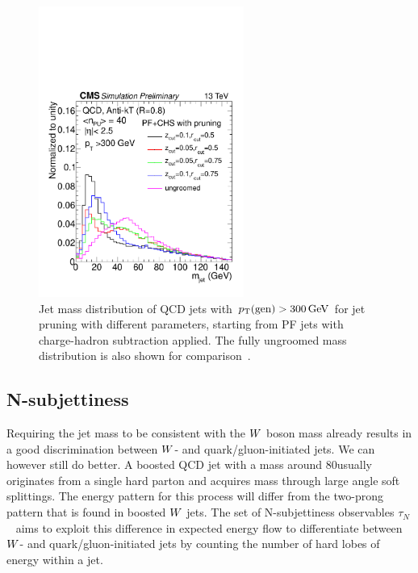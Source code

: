 \begin{figure}
  \centering
  \includegraphics[width=0.6\textwidth]{figures/razor_wtag/1DPFCHS_PR_QCD}
  \caption{Jet mass distribution of QCD jets with $p_{\mathrm{T}}(\textrm{gen}) > 300 \,\text{Ge\hspace{-.08em}V}$ for jet pruning
with different parameters, starting from PF jets with charge-hadron subtraction applied. The fully
ungroomed mass distribution is also shown for comparison~\cite{CMS-PAS-JME-14-001}. 
  \label{fig:wtag_jet_pruning}}
\end{figure}


\subsection{N-subjettiness}

Requiring the jet mass to be consistent with the $W$ boson mass already results in a good
discrimination between $W$- and quark/gluon-initiated jets. We can however still do better. A
boosted QCD jet with a mass around 80\GeV usually originates from a single hard parton and acquires
mass through large angle soft splittings. The energy pattern for this process will differ from the
two-prong pattern that is found in boosted $W$ jets.  
The set of N-subjettiness observables $\tau_N$~\cite{Thaler:2010tr} aims to exploit this difference
in expected energy flow to differentiate between $W$- and quark/gluon-initiated jets by counting
the number of hard lobes of energy within a jet.

